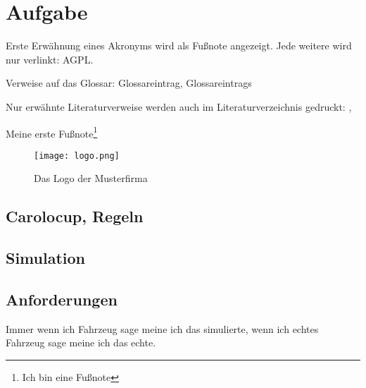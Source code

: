 
\chapter{Aufgabe}
Erste Erwähnung eines Akronyms wird als Fußnote angezeigt. Jede weitere wird
nur verlinkt: \acf{AGPL}. \cite{fsf:2007}

Verweise auf das Glossar: \gls{Glossareintrag}, \glspl{Glossareintrag}

Nur erwähnte Literaturverweise werden auch im Literaturverzeichnis gedruckt:
\cite{baumgartner:2002}, \cite{dreyfus:1980}

Meine erste Fußnote\footnote{Ich bin eine Fußnote}

\begin{wrapfigure}{r}{.4\textwidth}
\centering
\texttt{[image: logo.png]}
\vspace{-15pt}
\caption{Das Logo der Musterfirma\footnotemark}
\end{wrapfigure}

\section{Carolocup, Regeln}
\section{Simulation}
\section{Anforderungen}

Immer wenn ich Fahrzeug sage meine ich das simulierte, wenn ich echtes Fahrzeug sage meine ich das echte.
